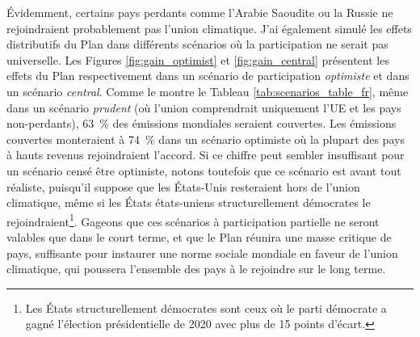 \documentclass[a5paper,french,openany]{memoir}
\begin{document}
Évidemment, certains pays perdants comme l'Arabie Saoudite ou la Russie ne rejoindraient probablement pas l'union climatique. J'ai également simulé les effets distributifs du Plan dans différents scénarios où la participation ne serait pas universelle. Les Figures \ref{fig:gain_optimist} et \ref{fig:gain_central} présentent les effets du Plan respectivement dans un scénario de participation \textit{optimiste} et dans un scénario \textit{central}. Comme le montre le Tableau \ref{tab:scenarios_table_fr}, même dans un scénario \textit{prudent} (où l'union comprendrait uniquement l'UE et les pays non-perdants), 63~\% des émissions mondiales seraient couvertes. Les émissions couvertes monteraient à 74~\% dans un scénario optimiste où la plupart des pays à hauts revenus rejoindraient l'accord. Si ce chiffre peut sembler insuffisant pour un scénario censé être optimiste, notons toutefois que ce scénario est avant tout réaliste, puisqu'il suppose que les États-Unis resteraient hors de l'union climatique, même si les États états-uniens structurellement démocrates le rejoindraient\footnote{Les États structurellement démocrates sont ceux où le parti démocrate a gagné l'élection présidentielle de 2020 avec plus de 15 points d'écart.}. Gageons que ces scénarios à participation partielle ne seront valables que dans le court terme, et que le Plan réunira une masse critique de pays, suffisante pour instaurer une norme sociale mondiale en faveur de l'union climatique, qui poussera l'ensemble des pays à le rejoindre sur le long terme.
\end{document}
